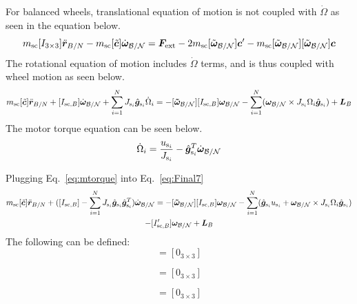 For balanced wheels, translational equation of motion is not coupled with $\dot{\Omega}$ as seen in the equation below.
\begin{equation}
m_{\text{sc}} [I_{3 \times 3}]\ddot{\bm r}_{B/N}
-m_{\text{sc}} [\tilde{\bm{c}}] \dot{\bm\omega}_{\cal B/N} 
= \bm F_{\text{ext}}- 2 m_{\text{sc}} [\tilde{\bm\omega}_{\cal B/N}] \bm c'
-m_{\text{sc}} [\tilde{\bm\omega}_{\cal B/N}][\tilde{\bm\omega}_{\cal B/N}]\bm{c}
\label{eq:Rbddot35}
\end{equation}
The rotational equation of motion includes $\dot{\Omega}$ terms, and is thus coupled with wheel motion as seen below.
\begin{multline}
m_{\text{sc}}[\tilde{\bm{c}}] \ddot{\bm r}_{B/N}
+[I_{\text{sc},B}] \dot{\bm\omega}_{\cal B/N}
+\sum_{i=1}^{N}J_{\text{s}_i} \hat{\bm g}_{\text{s}_i}\dot{\Omega}_i
= -[\bm{\tilde{\omega}}_{\cal B/N}] [I_{\text{sc},B}] \bm\omega_{\cal B/N} - \sum_{i=1}^{N}(\bm\omega_{\cal B/N}\times J_{\text{s}_i}\Omega_i\hat{\bm g}_{\text{s}_i})
+ \bm{L}_B
\label{eq:Final7}
\end{multline}
The motor torque equation can be seen below.
\begin{equation}
\dot{\Omega}_i = \frac{u_{\text{s}_i}}{J_{\text{s}_i}}-\hat{\bm g}_{\text{s}_i}^T \dot{\bm{\omega}}_{\cal B/N}
\label{eq:mtorque}
\end{equation}

Plugging Eq.~\eqref{eq:mtorque} into Eq.~\eqref{eq:Final7}
\begin{multline}
m_{\text{sc}}[\tilde{\bm{c}}] \ddot{\bm r}_{B/N}
+([I_{\text{sc},B}]-\sum_{i=1}^{N}J_{\text{s}_i} \hat{\bm g}_{\text{s}_i} \hat{\bm g}_{\text{s}_i}^T) \dot{\bm\omega}_{\cal B/N}
= -[\bm{\tilde{\omega}}_{\cal B/N}] [I_{\text{sc},B}] \bm\omega_{\cal B/N} - \sum_{i=1}^{N}(\hat{\bm g}_{\text{s}_i} u_{\text{s}_i} + \bm\omega_{\cal B/N}\times J_{\text{s}_i}\Omega_i\hat{\bm g}_{\text{s}_i})
\\- [I'_{\text{sc},B}] \bm\omega_{\cal B/N}
+ \bm{L}_B
\label{eq:Final72}
\end{multline}
The following can be defined:
\begin{equation}
[A_\text{contr}] = [0_{3 \times 3}]
\end{equation}

\begin{equation}
[B_\text{contr}] = [0_{3 \times 3}]
\end{equation}

\begin{equation}
[C_\text{contr}] = [0_{3 \times 3}]
\end{equation}


